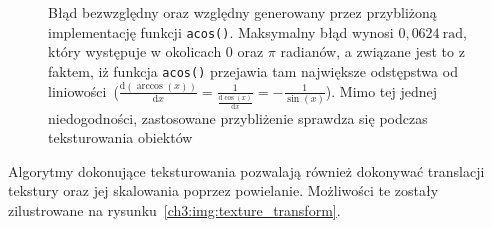 \begin{enumerate}
\begin{itemize}
\begin{figure}[H]
\centering
{}
\caption[Błąd bezwzględny oraz względny generowany przez przybliżoną implementację funkcji \texttt{acos()}]{Błąd bezwzględny oraz względny generowany przez przybliżoną implementację funkcji \texttt{acos()}. Maksymalny błąd wynosi $0,0624\ \mathrm{rad}$, który występuje w okolicach 0 oraz $\pi$ radianów, a związane jest to z faktem, iż funkcja \texttt{acos()} przejawia tam największe odstępstwa od liniowości~($\frac{\mathrm{d}(\arccos(x))}{\mathrm{d}x} = \frac{1}{\frac{\mathrm{d}\cos(x)}{\mathrm{d}x}} = -\frac{1}{\sin(x)}$). Mimo tej jednej niedogodności, zastosowane przybliżenie sprawdza się podczas teksturowania obiektów}
\label{ch3:img:acos_error}
\end{figure}

\end{itemize}

Algorytmy dokonujące teksturowania pozwalają również dokonywać translacji tekstury oraz jej skalowania poprzez powielanie. Możliwości te zostały zilustrowane na rysunku~\ref{ch3:img:texture_transform}.


\end{enumerate}
